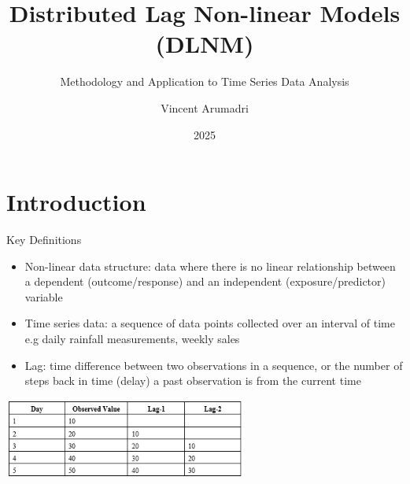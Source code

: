 \documentclass[english]{beamer}
\title{Distributed Lag Non-linear Models (DLNM)}
\subtitle{Methodology and Application to Time Series Data Analysis }
\author{Vincent Arumadri}
\institute{Department of Public Health \\
\vspace{0.3cm} Erasmus MC}
\date{2025}
\newcommand{\alertblue}[1]{{\color{blue}#1}}
\begin{document}
\begin{frame}
    \titlepage
\end{frame}
\section{Introduction}
\begin{frame}{Key Definitions}
   \begin{itemize}
    \item \alertblue{Non-linear data structure}: data where there is no linear relationship between a dependent (\alertblue{outcome/response}) and an independent (\alertblue{exposure/predictor}) variable
    \item \alertblue{Time series data}: a \alertblue{sequence of data points collected over an interval of time} e.g daily rainfall measurements, weekly sales 
    \item \alertblue{Lag}: time difference between two observations in a sequence, or the \alertblue{number of steps back in time (delay) a past observation is from the current time}
    \end{itemize}
    \vspace{0.15cm}
    
    \centering
    \includegraphics[width=8cm,keepaspectratio]{images/timeseries_lag.jpg}
    \vspace{0.15cm}
\end{frame}
\end{document}
